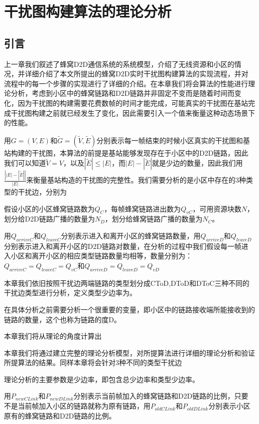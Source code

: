 \documentclass[figurelist,tablelist,algorithmlist,nomlist,masters]{seuthesix}
\begin{document}
	
	\chapter{干扰图构建算法的理论分析}
	\section{引言}
	上一章我们叙述了蜂窝D2D通信系统的系统模型，介绍了无线资源和小区的情况，并详细介绍了本文所提出的蜂窝D2D实时干扰图构建算法的实现流程，并对流程中的每一个步骤的实现进行了详细的介绍。在本章我们将会算法的性能进行理论分析，考虑到小区中的蜂窝链路和D2D链路并非固定不变而是随着时间而变化，因为干扰图的构建需要花费数帧的时间才能完成，可能真实的干扰图在基站完成干扰图构建之前就已经发生了变化，因此需要引入一个值来衡量这种动态场景下的性能。

	用$G = (V,E)$和$\tilde G = (\tilde V,\tilde E)$分别表示每一帧结束的时候小区真实的干扰图和基站构建的干扰图，本算法的前提是基站能够发现存在于小区中的D2D链路，因此我们可以知道$\tilde V  = V $，以及$\left| \tilde E \right| \le  \left| E \right|$，而$\left| E \right| - \left| \tilde E \right|$就是少边的数量，因此我们用$\frac{{\left| {\left| E \right| - \left| \tilde E \right|} \right|}}{{\left| E \right|}}$来衡量基站构造的干扰图的完整性。我们需要分析的是小区中存在的3种类型的干扰边，分别为

	假设小区的小区蜂窝链路数为$Q_C$，每帧蜂窝链路进出数为$Q_{vC}$，可用资源块数$N$，划分给D2D链路广播的数量为$N_D$，划分给蜂窝链路广播的数量为$N_C$。

	用$Q_{arriveC}$和$Q_{leaveC}$分别表示进入和离开小区的蜂窝链路数量，用$Q_{arriveD}$和$Q_{leaveD}$分别表示进入和离开小区的D2D链路对数量，在分析的过程中我们假设每一帧进入小区和离开小区的相应类型链路数量均相等，数量分别为：$Q_{arriveC} = Q_{leaveC} = Q_{vC}$和$Q_{arriveD} = Q_{leaveD} = Q_{vD}$

	本章我们依旧按照干扰边两端链路的类型划分成CToD,DToD和DToC三种不同的干扰边类型进行分析，定义类型少边率为。
	
	在具体分析之前需要分析一个很重要的变量，即小区中的链路接收端所能接收到的链路的数量，这个也称为链路的度D。
	
	
	本章我们将从理论的角度计算出
	
	本章我们将通过建立完整的理论分析模型，对所提算法进行详细的理论分析和验证所提算法的结果。同样本章将会针对3种不同的类型干扰边
	
	理论分析的主要参数是少边率，即包含总少边率和类型少边率。
	
	

	用$P_{newCLink}$和$P_{newDLink}$分别表示当前帧加入的蜂窝链路和D2D链路的比例，只要不是当前帧加入小区的链路就称为原有链路，用$P_{oldCLink}$和$P_{oldDLink}$分别表示小区原有的蜂窝链路和D2D链路的比例。
\end{document}
